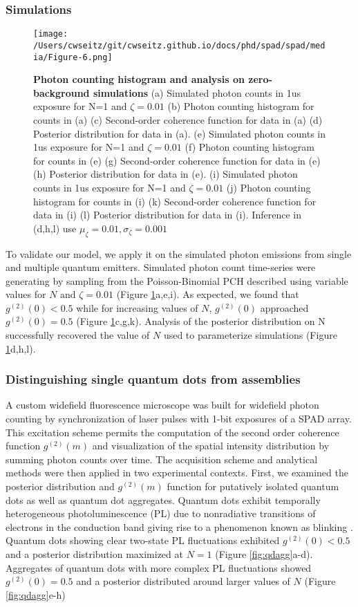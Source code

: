 \subsubsection{Simulations}

\begin{figure}
\centering
\texttt{[image: /Users/cwseitz/git/cwseitz.github.io/docs/phd/spad/spad/media/Figure-6.png]}
\caption{\textbf{Photon counting histogram and analysis on zero-background simulations} (a) Simulated photon counts in 1us exposure for N=1 and $\zeta=0.01$ (b) Photon counting histogram for counts in (a) (c) Second-order coherence function for data in (a) (d) Posterior distribution for data in (a). (e) Simulated photon counts in 1us exposure for N=1 and $\zeta=0.01$ (f) Photon counting histogram for counts in (e) (g) Second-order coherence function for data in (e) (h) Posterior distribution for data in (e). (i) Simulated photon counts in 1us exposure for N=1 and $\zeta=0.01$ (j) Photon counting histogram for counts in (i) (k) Second-order coherence function for data in (i) (l) Posterior distribution for data in (i). Inference in (d,h,l) use $\mu_\zeta=0.01,\sigma_\zeta=0.001$}
\label{fig:pch}
\end{figure}  

To validate our model, we apply it on the simulated photon emissions from single and multiple quantum emitters. Simulated photon count time-series were generating by sampling from the Poisson-Binomial PCH described using variable values for $N$ and $\zeta=0.01$ (Figure \ref{fig:pch}a,e,i). As expected, we found that $g^{(2)}(0)<0.5$  while for increasing values of $N$, $g^{(2)}(0)$ approached $g^{(2)}(0)=0.5$ (Figure \ref{fig:pch}c,g,k). Analysis of the posterior distribution on N successfully recovered the value of $N$ used to parameterize simulations (Figure \ref{fig:pch}d,h,l). 

\subsubsection{Distinguishing single quantum dots from assemblies}

A custom widefield fluorescence microscope was built for widefield photon counting by synchronization of laser pulses with 1-bit exposures of a SPAD array. This excitation scheme permits the computation of the second order coherence function  $g^{(2)}(m)$ and visualization of the spatial intensity distribution by summing photon counts over time. The acquisition scheme and analytical methods were then applied in two experimental contexts. First, we examined the posterior distribution and $g^{(2)}(m)$ function for putatively isolated quantum dots as well as quantum dot aggregates. Quantum dots exhibit temporally heterogeneous photoluminescence (PL) due to nonradiative transitions of electrons in the conduction band giving rise to a phenomenon known as blinking \parencite{Stoler1985,Furuta2022}. Quantum dots showing clear two-state PL fluctuations exhibited $g^{(2)}(0)<0.5$ and a posterior distribution maximized at $N=1$ (Figure \ref{fig:qdagg}a-d). Aggregates of quantum dots with more complex PL fluctuations showed $g^{(2)}(0)=0.5$ and a posterior distributed around larger values of $N$ (Figure \ref{fig:qdagg}e-h) 

